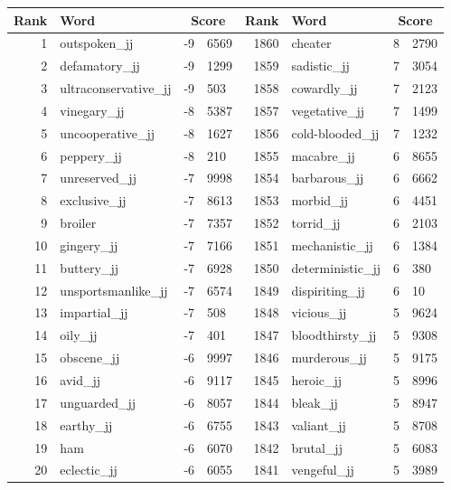 \begin{table}[tbp]
    \begin{tabular}{| rlr@{.}l | rlr@{.}l |}
    \hline
    \textbf{Rank} & \textbf{Word} & \multicolumn{2}{c|}{\textbf{Score}} & \textbf{Rank} & \textbf{Word} & \multicolumn{2}{c|}{\textbf{Score}} \\
    \hline
    1 & outspoken\_jj & -9 & 6569    &    1860 & cheater & 8 & 2790 \\
    2 & defamatory\_jj & -9 & 1299    &    1859 & sadistic\_jj & 7 & 3054 \\
    3 & ultraconservative\_jj & -9 & 503    &    1858 & cowardly\_jj & 7 & 2123 \\
    4 & vinegary\_jj & -8 & 5387    &    1857 & vegetative\_jj & 7 & 1499 \\
    5 & uncooperative\_jj & -8 & 1627    &    1856 & cold-blooded\_jj & 7 & 1232 \\
    6 & peppery\_jj & -8 & 210    &    1855 & macabre\_jj & 6 & 8655 \\
    7 & unreserved\_jj & -7 & 9998    &    1854 & barbarous\_jj & 6 & 6662 \\
    8 & exclusive\_jj & -7 & 8613    &    1853 & morbid\_jj & 6 & 4451 \\
    9 & broiler & -7 & 7357    &    1852 & torrid\_jj & 6 & 2103 \\
    10 & gingery\_jj & -7 & 7166    &    1851 & mechanistic\_jj & 6 & 1384 \\
    11 & buttery\_jj & -7 & 6928    &    1850 & deterministic\_jj & 6 & 380 \\
    12 & unsportsmanlike\_jj & -7 & 6574    &    1849 & dispiriting\_jj & 6 & 10 \\
    13 & impartial\_jj & -7 & 508    &    1848 & vicious\_jj & 5 & 9624 \\
    14 & oily\_jj & -7 & 401    &    1847 & bloodthirsty\_jj & 5 & 9308 \\
    15 & obscene\_jj & -6 & 9997    &    1846 & murderous\_jj & 5 & 9175 \\
    16 & avid\_jj & -6 & 9117    &    1845 & heroic\_jj & 5 & 8996 \\
    17 & unguarded\_jj & -6 & 8057    &    1844 & bleak\_jj & 5 & 8947 \\
    18 & earthy\_jj & -6 & 6755    &    1843 & valiant\_jj & 5 & 8708 \\
    19 & ham & -6 & 6070    &    1842 & brutal\_jj & 5 & 6083 \\
    20 & eclectic\_jj & -6 & 6055    &    1841 & vengeful\_jj & 5 & 3989 \\

\end{tabular}
\end{table}
